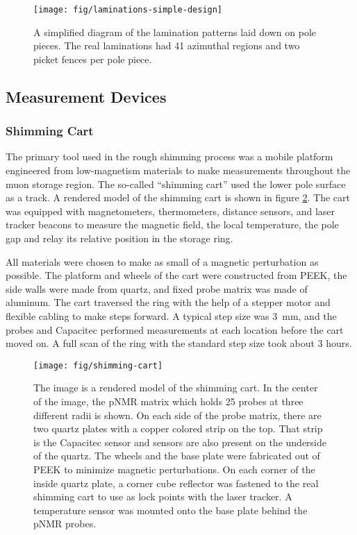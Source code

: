 \begin{figure}[h]
\centering
\texttt{[image: fig/laminations-simple-design]}
\caption{
    A simplified diagram of the lamination patterns laid down on pole pieces.  The real laminations had 41 azimuthal regions and two picket fences per pole piece. 
    \label{fig:laminations-simple-design}
}
\end{figure}

\subsection{Measurement Devices}

\subsubsection{Shimming Cart}
The primary tool used in the rough shimming process was a mobile platform engineered from low-magnetism materials to make measurements throughout the muon storage region.  The so-called ``shimming cart'' used the lower pole surface as a track.  A rendered model of the shimming cart is shown in figure \ref{fig:shimming-cart}.  The cart was equipped with magnetometers, thermometers, distance sensors, and laser tracker beacons to measure the magnetic field, the local temperature, the pole gap and relay its relative position in the storage ring.

All materials were chosen to make as small of a magnetic perturbation as possible.  The platform and wheels of the cart were constructed from PEEK, the side walls were made from quartz, and fixed probe matrix was made of aluminum.  The cart traversed the ring with the help of a stepper motor and flexible cabling to make steps forward.  A typical step size was \SI{3}{\mm}, and the probes and Capacitec performed measurements at each location before the cart moved on.  A full scan of the ring with the standard step size took about 3 hours.

\begin{figure}
\centering
\texttt{[image: fig/shimming-cart]}
\caption{
    The image is a rendered model of the shimming cart. In the center of the image, the pNMR matrix which holds 25 probes at three different radii is shown.  On each side of the probe matrix, there are two quartz plates with a copper colored strip on the top.  That strip is the Capacitec sensor and sensors are also present on the underside of the quartz.  The wheels and the base plate were fabricated out of PEEK to minimize magnetic perturbations. On each corner of the inside quartz plate, a corner cube reflector was fastened to the real shimming cart to use as lock points with the laser tracker. A temperature sensor was mounted onto the base plate behind the pNMR probes. 
    \label{fig:shimming-cart}
}
\end{figure}

